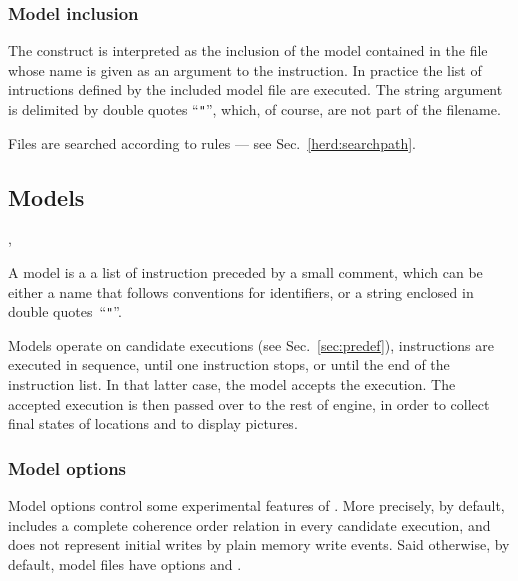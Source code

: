 \subsubsection*{Model inclusion}
The construct  is interpreted as
the inclusion of the model contained in the file whose name is given as
an argument to the  instruction.
In practice the list of intructions defined by the included model file
are executed.
The string argument is delimited by double quotes ``\verb+"+'',
which, of course, are not part of the filename.
\iftrue
Files are searched according to \herd{} rules --- see Sec.~\ref{herd:searchpath}.
\else
Notice that:
\begin{itemize}
\item Files are searched according to \herd{} rules --- see Sec.~\ref{herd:searchpath}.
\item Model options defined in the model file \synt{\nt{filename}} are ignored.
\end{itemize}
\fi

\subsection{\label{language:model}Models}
\begin{syntax}
 \is {}   \erepet
\sep
{} \is {} \orelse  {}
\end{syntax}
A model is a a list of instruction preceded by a small comment,
which can be either a name that follows \herd{} conventions for identifiers,
or a string enclosed in double quotes~``\verb+"+''.

Models operate on candidate executions
(see Sec.~\ref{sec:predef}),
instructions are executed in sequence,
until one instruction stops, or until the end of the instruction list.
In that latter case, the model accepts the execution.
The accepted execution is then passed over to the rest of \herd{}
engine, in order to collect final states of locations
and to display pictures.

\iffalse
\subsubsection*{Model options}

Model options control some experimental features of \herd.
More precisely, by default, \herd{} includes a complete
coherence order relation in every candidate execution,
and does not represent initial writes by plain memory
write events. Said otherwise, by default,
model files have options  and .

